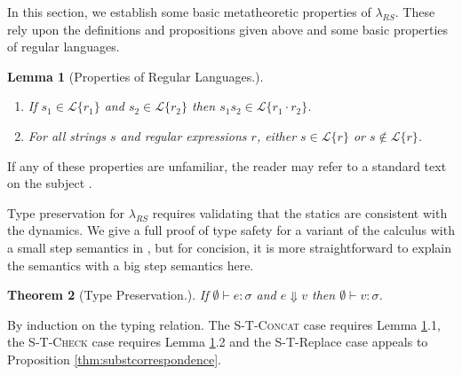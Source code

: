 \documentclass[10pt]{sigplanconf}
\newtheorem{thm}{Theorem}
\newtheorem{lem}[thm]{Lemma}
\theoremstyle{definition}
\newcommand{\Lagr}{\mathcal{L}}
\newcommand{\lang}[1]{\Lagr\{#1\}}
\newcommand{\lambdas}{\lambda_{RS}}
\newcommand{\stringin}[1]{{\sf stringin}[#1]}
\newcommand{\sctx}{\Psi} %
\newcommand{\sreduces}{ \Downarrow }
\begin{document}
In this section, we establish some basic metatheoretic properties of $\lambdas$.
These rely upon the definitions and propositions given above and some basic properties of regular languages. 

\begin{lem}[Properties of Regular Languages.] \label{thm:regexprops}
~
\begin{enumerate}
\item 
If $s_1 \in \lang{r_1}$ and $s_2 \in \lang{r_2}$ then $s_1s_2 \in \lang{r_1\cdot r_2}$.
\item 
For all strings $s$ and regular expressions $r$, either $s \in \lang{r}$ or $s \not \in \lang{r}$.
\end{enumerate}
\end{lem}

If any of these properties are unfamiliar, the reader may refer to a standard text on the subject \cite{cinderella}.


Type preservation for $\lambdas$ requires validating that the statics are consistent with the dynamics. We give a full proof of type safety for a variant of the calculus with a small step semantics in \cite{psptr}, but for concision, it is more straightforward to explain the semantics with a big step semantics here.


\begin{thm}[Type Preservation.] \label{thm:typesafety}
  If $\emptyset \vdash e : \sigma$ 
  and $e \sreduces v$ then $\emptyset \vdash v : \sigma$.
\end{thm}
\begin{prf}
By induction on the typing relation.
The \textsc{S-T-Concat} case requires Lemma \ref{thm:regexprops}.1, the \textsc{S-T-Check} case requires Lemma \ref{thm:regexprops}.2 
and the S-T-Replace case appeals to Proposition \ref{thm:substcorrespondence}.
\end{prf}
\end{document}
